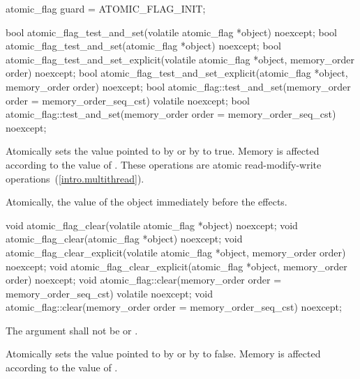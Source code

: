 \begin{codeblock}
atomic_flag guard = ATOMIC_FLAG_INIT;
\end{codeblock}
\exitexample

%
%
\begin{itemdecl}
bool atomic_flag_test_and_set(volatile atomic_flag *object) noexcept;
bool atomic_flag_test_and_set(atomic_flag *object) noexcept;
bool atomic_flag_test_and_set_explicit(volatile atomic_flag *object, memory_order order) noexcept;
bool atomic_flag_test_and_set_explicit(atomic_flag *object, memory_order order) noexcept;
bool atomic_flag::test_and_set(memory_order order = memory_order_seq_cst) volatile noexcept;
bool atomic_flag::test_and_set(memory_order order = memory_order_seq_cst) noexcept;
\end{itemdecl}

\begin{itemdescr}
\pnum
\effects Atomically sets the value pointed to by  or by  to true. Memory is affected according to the value of
. These operations are atomic read-modify-write operations~(\ref{intro.multithread}).

\pnum
\returns Atomically, the value of the object immediately before the effects. \end{itemdescr}

%
%
%
%
\begin{itemdecl}
void atomic_flag_clear(volatile atomic_flag *object) noexcept;
void atomic_flag_clear(atomic_flag *object) noexcept;
void atomic_flag_clear_explicit(volatile atomic_flag *object, memory_order order) noexcept;
void atomic_flag_clear_explicit(atomic_flag *object, memory_order order) noexcept;
void atomic_flag::clear(memory_order order = memory_order_seq_cst) volatile noexcept;
void atomic_flag::clear(memory_order order = memory_order_seq_cst) noexcept;
\end{itemdecl}

\begin{itemdescr}
\pnum
\requires The  argument shall not be 
 or .

\pnum
\effects Atomically sets the value pointed to by  or by  to
false. Memory is affected according to the value of .
\end{itemdescr}

